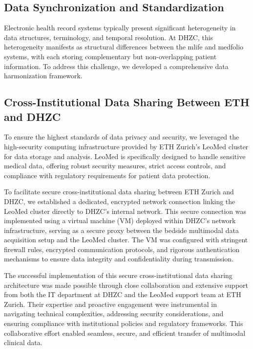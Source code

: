 \subsection{Data Synchronization and Standardization}

Electronic health record systems typically present significant heterogeneity in data structures, terminology, and temporal resolution. At DHZC, this heterogeneity manifests as structural differences between the mlife and medfolio systems, with each storing complementary but non-overlapping patient information. To address this challenge, we developed a comprehensive data harmonization framework.

\subsection{Cross-Institutional Data Sharing Between ETH and DHZC}

To ensure the highest standards of data privacy and security, we leveraged the high-security computing infrastructure provided by ETH Zurich's LeoMed cluster for data storage and analysis. LeoMed is specifically designed to handle sensitive medical data, offering robust security measures, strict access controls, and compliance with regulatory requirements for patient data protection.

To facilitate secure cross-institutional data sharing between ETH Zurich and DHZC, we established a dedicated, encrypted network connection linking the LeoMed cluster directly to DHZC's internal network. This secure connection was implemented using a virtual machine (VM) deployed within DHZC's network infrastructure, serving as a secure proxy between the bedside multimodal data acquisition setup and the LeoMed cluster. The VM was configured with stringent firewall rules, encrypted communication protocols, and rigorous authentication mechanisms to ensure data integrity and confidentiality during transmission.

The successful implementation of this secure cross-institutional data sharing architecture was made possible through close collaboration and extensive support from both the IT department at DHZC and the LeoMed support team at ETH Zurich. Their expertise and proactive engagement were instrumental in navigating technical complexities, addressing security considerations, and ensuring compliance with institutional policies and regulatory frameworks. This collaborative effort enabled seamless, secure, and efficient transfer of multimodal clinical data.

